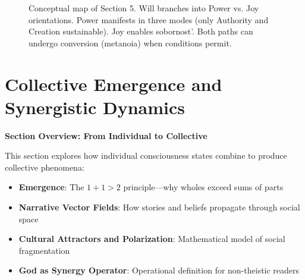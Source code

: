 \documentclass[11pt,a4paper]{article}
\theoremstyle{definition}
\theoremstyle{remark}
\begin{document}
\begin{small}
\begin{enumerate}
\begin{figure}[H]
\caption{Conceptual map of Section 5. Will branches into Power vs. Joy orientations. Power manifests in three modes (only Authority and Creation sustainable). Joy enables sobornost'. Both paths can undergo conversion (metanoia) when conditions permit.}
\label{fig:section5_map}
\end{figure}


\section{Collective Emergence and Synergistic Dynamics}

\begin{mdframed}[backgroundcolor=cyan!5,linewidth=2pt]
\textbf{Section Overview: From Individual to Collective}

This section explores how individual consciousness states combine to produce collective phenomena:

\begin{itemize}[nosep]
    \item \textbf{Emergence}: The \(1+1 > 2\) principle—why wholes exceed sums of parts
    \item \textbf{Narrative Vector Fields}: How stories and beliefs propagate through social space
    \item \textbf{Cultural Attractors and Polarization}: Mathematical model of social fragmentation
    \item \textbf{God as Synergy Operator}: Operational definition for non-theistic readers
\end{itemize}


\end{mdframed}
\end{enumerate}
\end{small}
\end{document}
